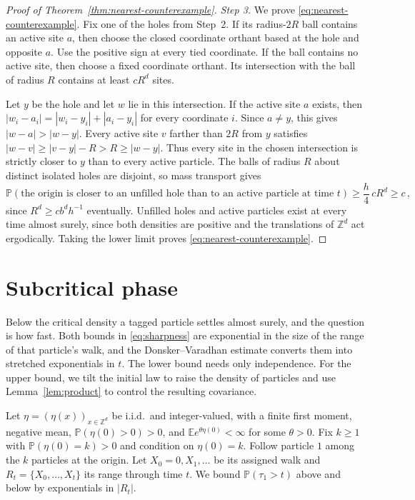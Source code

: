 \documentclass[11pt]{amsart}
\theoremstyle{plain}
\theoremstyle{definition}
\newcommand{\Z}{\mathbb{Z}}
\newcommand{\E}{\mathbb{E}}
\renewcommand{\P}{\mathbb{P}}
\begin{document}
\begin{proof}[Proof of Theorem~\ref{thm:nearest-counterexample}]
	\smallskip
	\noindent\emph{Step 3.} We prove \eqref{eq:nearest-counterexample}.
	Fix one of the holes from Step~2. If its radius-$2R$ ball contains an active
	site $a$, then choose the closed coordinate orthant based at the hole and
	opposite $a$. Use the positive sign at every tied coordinate. If the ball
	contains no active site, then choose a fixed coordinate orthant. Its
	intersection with the ball of radius $R$ contains at least $cR^d$ sites.

	Let $y$ be the hole and let $w$ lie in this intersection. If the active site
	$a$ exists, then
	$|w_i-a_i|=|w_i-y_i|+|a_i-y_i|$ for every coordinate $i$. Since $a\ne y$,
	this gives $|w-a|>|w-y|$. Every active site $v$ farther than $2R$ from $y$
	satisfies $|w-v|\geq|v-y|-R>R\geq|w-y|$. Thus every site in the chosen
	intersection is strictly closer to $y$ than to every active particle. The
	balls of radius $R$ about distinct isolated holes are disjoint, so mass
	transport gives
	\[
		\P(\text{the origin is closer to an unfilled hole than to an active
		particle at time }t)\geq\frac h4\,cR^d\geq c\,,
	\]
	since $R^d\geq cb^dh^{-1}$ eventually. Unfilled holes and active
	particles exist at every time almost surely, since both densities are
	positive and the translations of $\Z^d$ act ergodically. Taking the
	lower limit proves
	\eqref{eq:nearest-counterexample}.
\end{proof}

\section{Subcritical phase}\label{sec:subcritical}

Below the critical density a tagged particle settles almost surely, and the
question is how fast. Both bounds in \eqref{eq:sharpness} are exponential in
the size of the range of that particle's walk, and the Donsker--Varadhan
estimate converts them into stretched exponentials in $t$. The lower bound
needs only independence. For the upper bound, we tilt the initial law to raise
the density of particles and use Lemma~\ref{lem:product} to control the
resulting covariance.

Let $\eta=(\eta(x))_{x\in\Z^d}$ be i.i.d.\ and integer-valued, with a finite
first moment, negative mean, $\P(\eta(0)>0)>0$, and
$\E e^{\theta\eta(0)}<\infty$ for some $\theta>0$. Fix $k\geq1$ with
$\P(\eta(0)=k)>0$ and condition on $\eta(0)=k$. Follow particle $1$ among the
$k$ particles at the origin. Let $X_0=0,X_1,\ldots$ be its assigned walk and
$R_t=\{X_0,\ldots,X_t\}$ its range through time $t$. We bound
$\P(\tau_1>t)$ above and below by exponentials in $|R_t|$.
\end{document}
